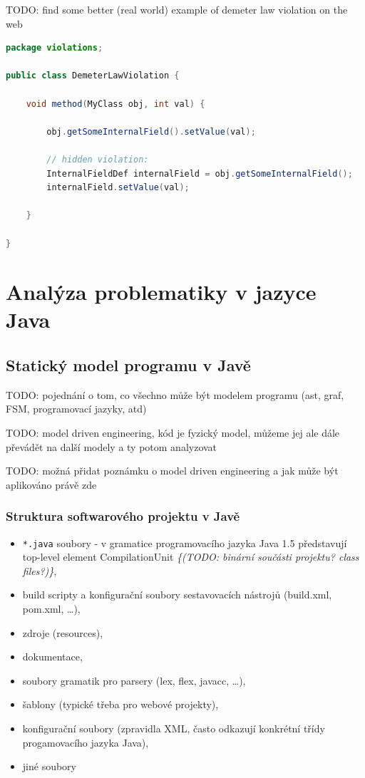 TODO: find some better (real world) example of demeter law violation on the web
\begin{lstlisting}[language=java]
package violations;

public class DemeterLawViolation {

    void method(MyClass obj, int val) {

        obj.getSomeInternalField().setValue(val);

        // hidden violation:
        InternalFieldDef internalField = obj.getSomeInternalField();
        internalField.setValue(val);

    }

}
\end{lstlisting}

\section{Analýza problematiky v jazyce Java}

\subsection{Statický model programu v Javě}
TODO: pojednání o tom, co všechno může být modelem programu (ast, graf, FSM, programovací jazyky, atd)

TODO: model driven engineering, kód je fyzický model, můžeme jej ale dále převádět na další modely a ty potom analyzovat

TODO: možná přidat poznámku o model driven engineering a jak může být aplikováno právě zde

\subsubsection{Struktura softwarového projektu v Javě}


\begin{itemize}
\item\verb+*.java+ soubory - v gramatice programovacího jazyka Java 1.5 představují top-level element CompilationUnit \emph{\{(TODO: binární součásti projektu? class files?)\}},
\item build scripty a konfigurační soubory sestavovacích nástrojů (build.xml, pom.xml, \ldots),
\item zdroje (resources),
\item dokumentace,
\item soubory gramatik pro parsery (lex, flex, javacc, \ldots),
\item šablony (typické třeba pro webové projekty),
\item konfigurační soubory (zpravidla XML, často odkazují konkrétní třídy progamovacího jazyka Java),
\item jiné soubory
\end{itemize}

